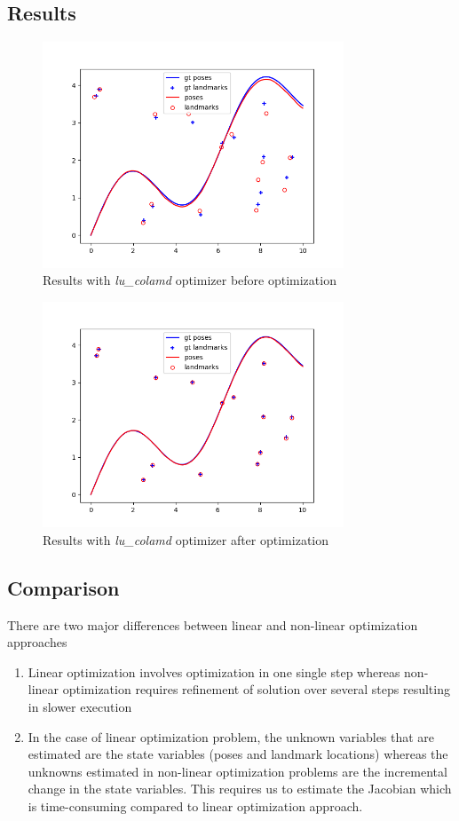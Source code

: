 \documentclass[12pt, a4paper]{article}
\begin{document}
\subsection{Results}
\begin{figure}[H]
  \centering
  \includegraphics[width=0.8\textwidth]{./results/nonlinear/lu_colamd_2d_nonlinear_map_before.png}
  \caption{Results with \textit{lu\_colamd} optimizer before optimization}
\end{figure}
\begin{figure}[H]
  \centering
  \includegraphics[width=0.8\textwidth]{./results/nonlinear/lu_colamd_2d_nonlinear_map_after.png}
  \caption{Results with \textit{lu\_colamd} optimizer after optimization}
\end{figure}
\subsection{Comparison}
There are two major differences between linear and non-linear optimization approaches
\begin{enumerate}
  \item Linear optimization involves optimization in one single step whereas non-linear optimization requires refinement of solution over several steps resulting in slower execution
  \item In the case of linear optimization problem, the unknown variables that are estimated are the state variables (poses and landmark locations) whereas the unknowns estimated in non-linear optimization problems are the incremental change in the state variables. This requires us to estimate the Jacobian which is time-consuming compared to linear optimization approach.
\end{enumerate}
\end{document}
